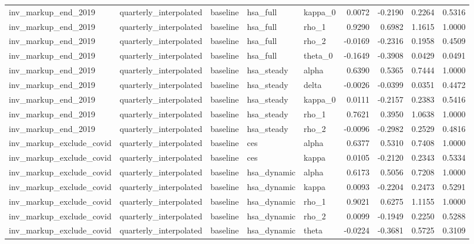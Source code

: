 \begin{tabular}{lllllrrrr}
inv\_markup\_end\_2019 & quarterly\_interpolated & baseline & hsa\_full & kappa\_0 & 0.0072 & -0.2190 & 0.2264 & 0.5316 \\
inv\_markup\_end\_2019 & quarterly\_interpolated & baseline & hsa\_full & rho\_1 & 0.9290 & 0.6982 & 1.1615 & 1.0000 \\
inv\_markup\_end\_2019 & quarterly\_interpolated & baseline & hsa\_full & rho\_2 & -0.0169 & -0.2316 & 0.1958 & 0.4509 \\
inv\_markup\_end\_2019 & quarterly\_interpolated & baseline & hsa\_full & theta\_0 & -0.1649 & -0.3908 & 0.0429 & 0.0491 \\
inv\_markup\_end\_2019 & quarterly\_interpolated & baseline & hsa\_steady & alpha & 0.6390 & 0.5365 & 0.7444 & 1.0000 \\
inv\_markup\_end\_2019 & quarterly\_interpolated & baseline & hsa\_steady & delta & -0.0026 & -0.0399 & 0.0351 & 0.4472 \\
inv\_markup\_end\_2019 & quarterly\_interpolated & baseline & hsa\_steady & kappa\_0 & 0.0111 & -0.2157 & 0.2383 & 0.5416 \\
inv\_markup\_end\_2019 & quarterly\_interpolated & baseline & hsa\_steady & rho\_1 & 0.7621 & 0.3950 & 1.0638 & 1.0000 \\
inv\_markup\_end\_2019 & quarterly\_interpolated & baseline & hsa\_steady & rho\_2 & -0.0096 & -0.2982 & 0.2529 & 0.4816 \\
inv\_markup\_exclude\_covid & quarterly\_interpolated & baseline & ces & alpha & 0.6377 & 0.5310 & 0.7408 & 1.0000 \\
inv\_markup\_exclude\_covid & quarterly\_interpolated & baseline & ces & kappa & 0.0105 & -0.2120 & 0.2343 & 0.5334 \\
inv\_markup\_exclude\_covid & quarterly\_interpolated & baseline & hsa\_dynamic & alpha & 0.6173 & 0.5056 & 0.7208 & 1.0000 \\
inv\_markup\_exclude\_covid & quarterly\_interpolated & baseline & hsa\_dynamic & kappa & 0.0093 & -0.2204 & 0.2473 & 0.5291 \\
inv\_markup\_exclude\_covid & quarterly\_interpolated & baseline & hsa\_dynamic & rho\_1 & 0.9021 & 0.6275 & 1.1155 & 1.0000 \\
inv\_markup\_exclude\_covid & quarterly\_interpolated & baseline & hsa\_dynamic & rho\_2 & 0.0099 & -0.1949 & 0.2250 & 0.5288 \\
inv\_markup\_exclude\_covid & quarterly\_interpolated & baseline & hsa\_dynamic & theta & -0.0224 & -0.3681 & 0.5725 & 0.3109 \\

\end{tabular}
